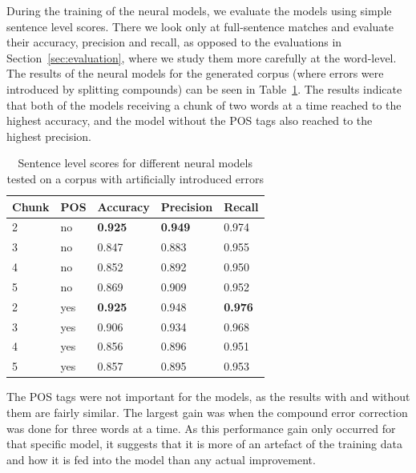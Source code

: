 \documentclass[postprint]{flammie}
\begin{document}
During the training of the neural models, we evaluate the models using simple
sentence level scores. There we look only at full-sentence matches and evaluate
their accuracy, precision and recall, as opposed to the evaluations in
Section~\ref{sec:evaluation}, where we study them more carefully at the
word-level.  The results of the neural models for the generated corpus (where
errors were introduced by splitting compounds) can be seen in
Table~\ref{tab:results-neural}. The results indicate that both of the models
receiving a chunk of two words at a time reached to the highest accuracy, and
the model without the POS tags also reached to the highest precision.

\begin{table}[htb]
\centering
\begin{tabular}{lllll}
\toprule
\bf Chunk & \bf POS & \bf Accuracy            & \bf Precision           & \bf
    Recall         \\ \midrule
2     & no  & \textbf{0.925} & \textbf{0.949} & 0.974          \\
3     & no  & 0.847          & 0.883          & 0.955          \\
4     & no  & 0.852          & 0.892          & 0.950          \\
5     & no  & 0.869          & 0.909          & 0.952          \\
2     & yes & \textbf{0.925} & 0.948          & \textbf{0.976}          \\
3     & yes & 0.906          & 0.934          & 0.968          \\
4     & yes & 0.856          & 0.896          & 0.951 \\
5     & yes & 0.857          & 0.895          & 0.953          \\
    \bottomrule
\end{tabular}
\caption{Sentence level scores for different neural models tested on a corpus
    with artificially introduced errors\label{tab:results-neural}}
\end{table}


The POS tags were not important for the models, as the results with and without
them are fairly similar. The largest gain was when the compound error correction
was done for three words at a time. As this performance gain only occurred for
that specific model, it suggests that it is more of an artefact of the training
data and how it is fed into the model than any actual improvement.
\end{document}
